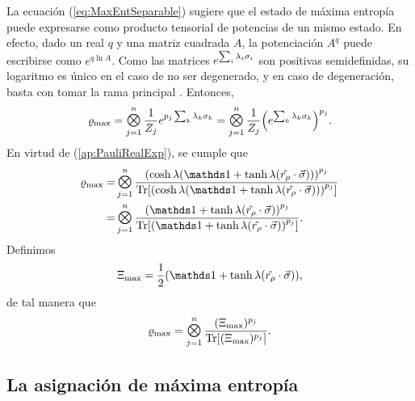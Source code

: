 La ecuación (\ref{eq:MaxEntSeparable}) sugiere que el estado de máxima entropía puede expresarse como producto tensorial de potencias de un mismo estado. En efecto, dado un real $q$ y una matriz cuadrada $A$, la potenciación $A^{q}$ puede escribirse como $e^{q \ln A}$. Como las matrices $e^{\sum_{i}\lambda_{i}\sigma_{i}}$ son positivas semidefinidas, su logaritmo es único en el caso de no ser degenerado, y en caso de degeneración, basta con tomar la rama principal \cite{log1,Davalos2019}. Entonces,
\begin{equation}
    \varrho_{\max}=\Motimes_{j=1}^{n}\frac{1}{Z_{j}}e^{p_{j}\sum_{k}\lambda_{k}\pauli{k}}=\Motimes_{j=1}^{n}\frac{1}{Z_{j}}\qty(e^{\sum_{k}\lambda_{k}\pauli{k}})^{p_{j}}.\nonumber
\end{equation}
En virtud de (\ref*{ap:PauliRealExp}), se cumple que
\begin{align}
  \varrho_{\max}=&\Motimes_{j=1}^{n}\frac{\qty(\cosh{\lambda}(\Id+\tanh{\lambda}(\paulivec{r_{\rho}})))^{p_{j}}}{\Tr[\qty(\cosh{\lambda}(\Id+\tanh{\lambda}(\paulivec{r_{\rho}})))^{p_{j}}]}\nonumber\\
  =&\Motimes_{j=1}^{n}\frac{\qty(\Id+\tanh{\lambda}(\paulivec{r_{\rho}}))^{p_{j}}}{\Tr[\qty(\Id+\tanh{\lambda}(\paulivec{r_{\rho}}))^{p_{j}}]}.\nonumber
\end{align}
Definimos
\begin{equation}\label{eq:Xi}
  \Xi_{\max}=\frac{1}{2}(\Id+\tanh{\lambda}(\paulivec{r_{\rho}})),
\end{equation}
de tal manera que 
\begin{equation}\label{eq:MaxEntSeparablePower}
  \varrho_{\max}=\Motimes_{j=1}^{n}\frac{(\Xi_{\max})^{p_{j}}}{\Tr[ (\Xi_{\max})^{p_{j}}]}.
\end{equation}

\subsection{La asignación de máxima entropía}

